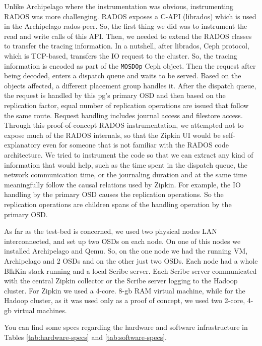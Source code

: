Unlike Archipelago where the instrumentation was obvious, instrumenting RADOS
was more challenging. RADOS exposes a C-API (librados) which is used in the
Archipelago rados-peer. So, the first thing we did was to instrument the read
and write calls of this API. Then, we needed to extend the RADOS classes to
transfer the tracing information. In a nutshell, after librados, Ceph protocol,
which is TCP-based, transfers the IO request to the cluster. So, the tracing
information is encoded as part of the \texttt{MOSDOp} Ceph object. Then the
request after being decoded, enters a dispatch queue and waits to be served.
Based on the objects affected, a different placement group handles it. After the
dispatch queue, the request is handled by this pg's primary OSD and then based
on the replication factor, equal number of replication operations are issued
that follow the same route. Request handling includes journal access and
filestore access. Through this proof-of-concept RADOS instrumentation, we
attempted not to expose much of the RADOS internals, so that the Zipkin UI would
be self-explanatory even for someone that is not familiar with the RADOS code
architecture. We tried to instrument the code so that we can extract any kind of
information that would help, such as the time spent in the dispatch queue, the
network communication time, or the journaling duration and at the same time
meaningfully follow the causal relations used by Zipkin. For example, the IO
handling by the primary OSD causes the replication operations. So the
replication operations are children spans of the handling operation by the
primary OSD.

As far as the test-bed is concerned, we used two physical nodes LAN
interconnected, and set up two OSDs on each node. On one of this nodes we
installed Archipelago and Qemu. So, on the one node we had the running VM,
Archipelago and 2 OSDs and on the other just two OSDs. Each node had a whole
BlkKin stack running and a local Scribe server. Each Scribe server communicated
with the central Zipkin collector or the Scribe server logging to the Hadoop
cluster. For Zipkin we used a 4-core. 8-gb RAM virtual machine, while for the
Hadoop cluster, as it was used only as a proof of concept, we used two 2-core,
4-gb virtual machines. 

You can find some specs regarding the hardware and software infrastructure in
Tables
\ref{tab:hardware-specs} and \ref{tab:software-specs}. 


